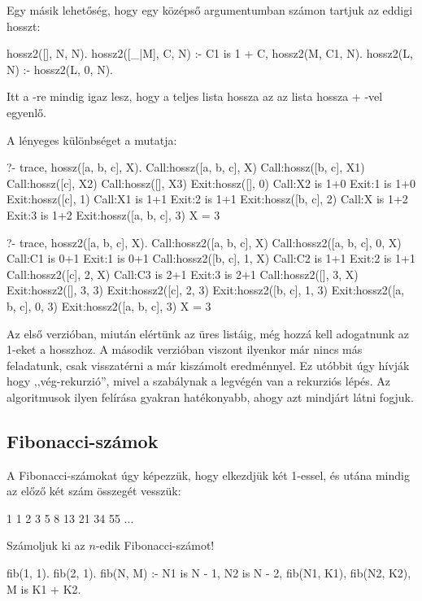 Egy másik lehetőség, hogy egy középső argumentumban
számon tartjuk az eddigi hosszt:
\begin{program}
hossz2([], N, N).
hossz2([_|M], C, N) :- C1 is 1 + C, hossz2(M, C1, N).
hossz2(L, N) :- hossz2(L, 0, N).
\end{program}
Itt a -re mindig igaz lesz,
hogy a teljes lista hossza az az  lista
hossza + -vel egyenlő.

A lényeges különbséget a  mutatja:
\begin{query}
?- trace, hossz([a, b, c], X).
Call:hossz([a, b, c], X)
  Call:hossz([b, c], X1)
    Call:hossz([c], X2)
      Call:hossz([], X3)
      Exit:hossz([], 0)
      Call:X2 is 1+0
      Exit:1 is 1+0
    Exit:hossz([c], 1)
    Call:X1 is 1+1
    Exit:2 is 1+1
  Exit:hossz([b, c], 2)
  Call:X is 1+2
  Exit:3 is 1+2
Exit:hossz([a, b, c], 3)
X = 3

?- trace, hossz2([a, b, c], X).
Call:hossz2([a, b, c], X)
  Call:hossz2([a, b, c], 0, X)
    Call:C1 is 0+1
    Exit:1 is 0+1
    Call:hossz2([b, c], 1, X)
      Call:C2 is 1+1
      Exit:2 is 1+1
      Call:hossz2([c], 2, X)
        Call:C3 is 2+1
        Exit:3 is 2+1
        Call:hossz2([], 3, X)
        Exit:hossz2([], 3, 3)
      Exit:hossz2([c], 2, 3)
    Exit:hossz2([b, c], 1, 3)
  Exit:hossz2([a, b, c], 0, 3)
Exit:hossz2([a, b, c], 3)
X = 3
\end{query}
Az első verzióban, miután elértünk az üres listáig,
még hozzá kell adogatnunk az 1-eket a hosszhoz. A
második verzióban viszont ilyenkor már nincs más
feladatunk, csak visszatérni a már kiszámolt
eredménnyel. Ez utóbbit úgy hívják hogy
,,vég-rekurzió'', mivel a szabálynak a legvégén van
a rekurziós lépés. Az algoritmusok ilyen felírása
gyakran hatékonyabb, ahogy azt mindjárt látni
fogjuk.

\subsection*{Fibonacci-számok}
A Fibonacci-számokat úgy képezzük, hogy elkezdjük
két 1-essel, és utána mindig az előző két szám
összegét vesszük:
\begin{query}
1 1 2 3 5 8 13 21 34 55 ...
\end{query}
Számoljuk ki az $n$-edik Fibonacci-számot!
\begin{program}
fib(1, 1).
fib(2, 1).
fib(N, M) :-
    N1 is N - 1, N2 is N - 2,
    fib(N1, K1), fib(N2, K2),
    M is K1 + K2.
\end{program}

